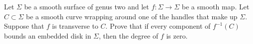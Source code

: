 Let $\Sigma$ be a smooth surface of genus two and let
$f:\Sigma\rightarrow \Sigma$ be a smooth map. Let $C\subset \Sigma$ be
a smooth curve wrapping around one of the handles that make up
$\Sigma$. Suppose that $f$ is transverse to $C$. Prove that if every
component of $f^{-1}(C)$ bounds an embedded disk in $\Sigma$, then the
degree of $f$ is zero.
